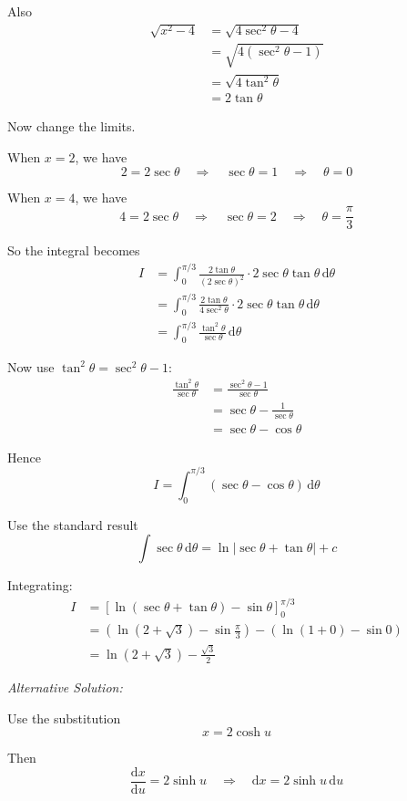 \documentclass[leqno]{article}
\begin{document}
\begin{enumerate}[
  label=\textbf{\arabic*.},
  leftmargin=*,
  topsep=0pt,
  partopsep=0pt,
  parsep=0pt
]
\begin{djsSolution}
Also
\begin{align*}
\sqrt{x^2-4}
&=\sqrt{4\sec^2\theta-4} \\
&=\sqrt{4(\sec^2\theta-1)} \\
&=\sqrt{4\tan^2\theta} \\
&=2\tan\theta
\end{align*}

Now change the limits.

When \(x=2\), we have
\[
2=2\sec\theta\quad\Longrightarrow\quad\sec\theta=1\quad\Longrightarrow\quad\theta=0
\]

When \(x=4\), we have
\[
4=2\sec\theta\quad\Longrightarrow\quad\sec\theta=2\quad\Longrightarrow\quad\theta=\frac{\pi}{3}
\]

So the integral becomes
\begin{align*}
I
&=\int_0^{\pi/3} \frac{2\tan\theta}{(2\sec\theta)^2}\cdot 2\sec\theta\tan\theta\,\mathrm{d}\theta \\
&=\int_0^{\pi/3} \frac{2\tan\theta}{4\sec^2\theta}\cdot 2\sec\theta\tan\theta\,\mathrm{d}\theta \\
&=\int_0^{\pi/3} \frac{\tan^2\theta}{\sec\theta}\,\mathrm{d}\theta
\end{align*}

Now use \(\tan^2\theta=\sec^2\theta-1\):
\begin{align*}
\frac{\tan^2\theta}{\sec\theta}
&=\frac{\sec^2\theta-1}{\sec\theta} \\
&=\sec\theta-\frac{1}{\sec\theta} \\
&=\sec\theta-\cos\theta
\end{align*}

Hence
\[
I=\int_0^{\pi/3} (\sec\theta-\cos\theta)\,\mathrm{d}\theta
\]

Use the standard result
\[
\int \sec\theta\,\mathrm{d}\theta=\ln\left|\sec\theta+\tan\theta\right|+c
\]

Integrating:
\begin{align*}
I
&=\left[\ln(\sec\theta+\tan\theta)-\sin\theta\right]_0^{\pi/3} \\
&=\left(\ln\left(2+\sqrt{3}\right)-\sin\frac{\pi}{3}\right)-\left(\ln(1+0)-\sin0\right) \\
&=\ln\left(2+\sqrt{3}\right)-\frac{\sqrt{3}}{2}
\end{align*}

\medskip

\textit{Alternative Solution:}

Use the substitution
\[
x=2\cosh u
\]

Then
\[
\frac{\mathrm{d}x}{\mathrm{d}u}=2\sinh u
\quad\Longrightarrow\quad
\mathrm{d}x=2\sinh u\,\mathrm{d}u
\]


\end{djsSolution}
\end{enumerate}
\end{document}
